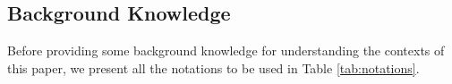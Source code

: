 \documentclass{article}
\begin{document}
\subsection{Background Knowledge}
Before providing some background knowledge for understanding the contexts of this paper, we present all the notations to be used in Table \ref{tab:notations}.

\end{document}
